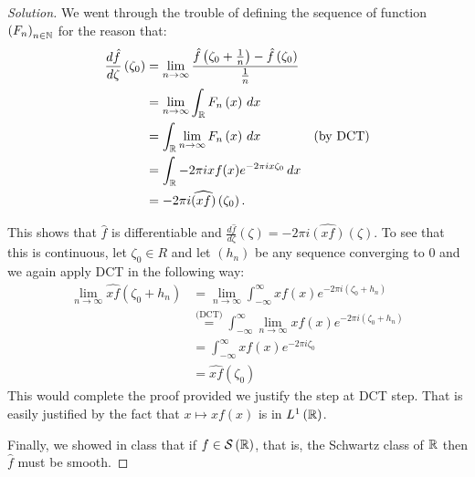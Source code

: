 \begin{proof}[Solution]
We went through the trouble of defining the sequence of function $\left( F_{n} \right)_{n\in \mathbb N}$ for the reason that:
\begin{align*}
\frac{d\hat{f}}{d\zeta} \left( \zeta_{0} \right) &= \lim_{n \to \infty} \frac{\hat{f} \left( \zeta_{0} + \frac{1}{n} \right) - \hat{f} \left( \zeta_{0} \right)}{\frac{1}{n}} \\
&= \lim_{n\to \infty} \int_{\mathbb R} F_{n} \left( x \right) \, dx \\
&= \int_{\mathbb R} \lim_{n\to \infty} F_{n} \left( x \right) \, dx & \text{(by DCT)} \\
&= \int_{\mathbb R}  -2\pi i x f(x)e^{-2\pi i x \zeta_{0}} \, dx \\
&= -2\pi i \widehat{\left( x f \right)} \left( \zeta_{0} \right).
\end{align*}

This shows that $\hat{f}$ is differentiable and $\frac{d\hat{f}}{d\zeta} \left( \zeta \right) = -2\pi i \widehat{\left( xf \right)} \left( \zeta \right)$. To see that this is continuous, let $\zeta_{0} \in R$ and let $\left( h_{n} \right)$ be any sequence converging to $0$ and we again apply DCT in the following way:
\begin{align*}
\lim_{n \to \infty} \widehat{xf} \left( \zeta_{0} + h_{n} \right) &= \lim_{n\to \infty} \int_{-\infty}^{\infty} x f\left( x \right) e^{-2\pi i \left(\zeta_{0} + h_{n} \right)} \\
&\stackrel{\text{(DCT)}} {=}  \int_{-\infty}^{\infty}  \lim_{n\to \infty}x f\left( x \right) e^{-2\pi i \left(\zeta_{0} + h_{n} \right)} \\
&= \int_{-\infty}^{\infty}  x f\left( x \right) e^{-2\pi i \zeta_{0}} \\
&= \widehat{xf} \left( \zeta_{0} \right)
\end{align*}
This would complete the proof provided we justify the step at DCT step. That is easily justified by the fact that $x \mapsto x f(x)$ is in $L^{1} \left( \mathbb R \right)$.

Finally, we showed in class that if $f\in {\cal S} \left( \mathbb R \right)$, that is, the Schwartz class of $\mathbb R$ then $\hat{f}$ must be smooth.
\end{proof}
